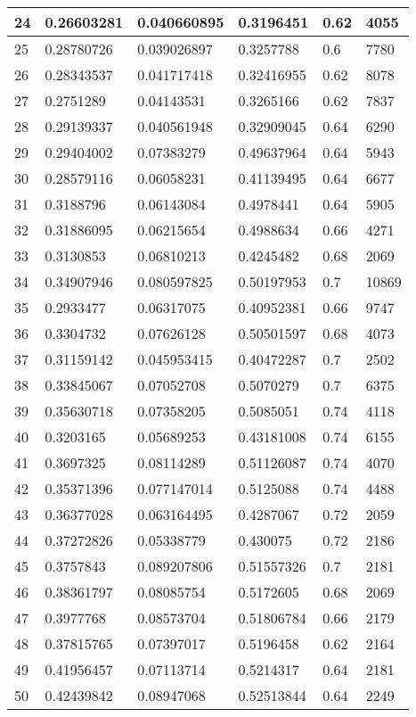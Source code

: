 \begin{longtable}{|l|l|l|l|l|l|}
24 & 0.26603281 & 0.040660895 & 0.3196451 & 0.62 & 4055 \\ \hline 
25 & 0.28780726 & 0.039026897 & 0.3257788 & 0.6 & 7780 \\ \hline 
26 & 0.28343537 & 0.041717418 & 0.32416955 & 0.62 & 8078 \\ \hline 
27 & 0.2751289 & 0.04143531 & 0.3265166 & 0.62 & 7837 \\ \hline 
28 & 0.29139337 & 0.040561948 & 0.32909045 & 0.64 & 6290 \\ \hline 
29 & 0.29404002 & 0.07383279 & 0.49637964 & 0.64 & 5943 \\ \hline 
30 & 0.28579116 & 0.06058231 & 0.41139495 & 0.64 & 6677 \\ \hline 
31 & 0.3188796 & 0.06143084 & 0.4978441 & 0.64 & 5905 \\ \hline 
32 & 0.31886095 & 0.06215654 & 0.4988634 & 0.66 & 4271 \\ \hline 
33 & 0.3130853 & 0.06810213 & 0.4245482 & 0.68 & 2069 \\ \hline 
34 & 0.34907946 & 0.080597825 & 0.50197953 & 0.7 & 10869 \\ \hline 
35 & 0.2933477 & 0.06317075 & 0.40952381 & 0.66 & 9747 \\ \hline 
36 & 0.3304732 & 0.07626128 & 0.50501597 & 0.68 & 4073 \\ \hline 
37 & 0.31159142 & 0.045953415 & 0.40472287 & 0.7 & 2502 \\ \hline 
38 & 0.33845067 & 0.07052708 & 0.5070279 & 0.7 & 6375 \\ \hline 
39 & 0.35630718 & 0.07358205 & 0.5085051 & 0.74 & 4118 \\ \hline 
40 & 0.3203165 & 0.05689253 & 0.43181008 & 0.74 & 6155 \\ \hline 
41 & 0.3697325 & 0.08114289 & 0.51126087 & 0.74 & 4070 \\ \hline 
42 & 0.35371396 & 0.077147014 & 0.5125088 & 0.74 & 4488 \\ \hline 
43 & 0.36377028 & 0.063164495 & 0.4287067 & 0.72 & 2059 \\ \hline 
44 & 0.37272826 & 0.05338779 & 0.430075 & 0.72 & 2186 \\ \hline 
45 & 0.3757843 & 0.089207806 & 0.51557326 & 0.7 & 2181 \\ \hline 
46 & 0.38361797 & 0.08085754 & 0.5172605 & 0.68 & 2069 \\ \hline 
47 & 0.3977768 & 0.08573704 & 0.51806784 & 0.66 & 2179 \\ \hline 
48 & 0.37815765 & 0.07397017 & 0.5196458 & 0.62 & 2164 \\ \hline 
49 & 0.41956457 & 0.07113714 & 0.5214317 & 0.64 & 2181 \\ \hline 
50 & 0.42439842 & 0.08947068 & 0.52513844 & 0.64 & 2249 \\ \hline 
\end{longtable}